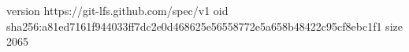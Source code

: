 version https://git-lfs.github.com/spec/v1
oid sha256:a81ed7161f944033ff7dc2e0d468625e56558772e5a658b48422c95cf8ebc1f1
size 2065
